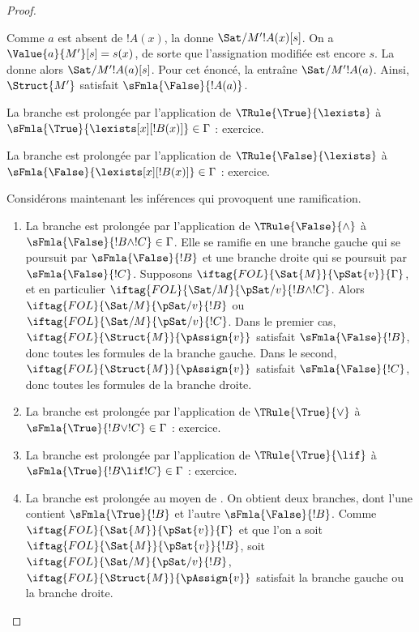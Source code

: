 \documentclass[../../../include/open-logic-section]{subfiles}
\begin{document}
\begin{proof}
\begin{enumerate}
{  Comme $a$ est absent de $!A(x)$, la
   donne $\Sat/{M'}{!A(x)}[s]$.
  On a $\Value{a}{M'}[s]=s(x)$, de sorte que l'assignation modifiée
  est encore $s$. La  donne alors
  $\Sat/{M'}{!A(a)}[s]$. Pour cet énoncé, la
   entraîne $\Sat/{M'}{!A(a)}$.
  Ainsi, $\Struct{M'}$ satisfait $\sFmla{\False}{!A(a)}$.
\item La branche est prolongée par l'application de
  $\TRule{\True}{\lexists}$ à
  $\sFmla{\True}{\lexists[x][!B(x)]} \in \Gamma$ : exercice.
\item La branche est prolongée par l'application de
  $\TRule{\False}{\lexists}$ à
  $\sFmla{\False}{\lexists[x][!B(x)]} \in \Gamma$ : exercice.}{}
\end{enumerate}
Considérons maintenant les inférences qui provoquent une ramification.
\begin{enumerate}
\item La branche est prolongée par l'application de
  $\TRule{\False}{\land}$ à
  $\sFmla{\False}{!B \land !C} \in \Gamma$. Elle se ramifie en une
  branche gauche qui se poursuit par $\sFmla{\False}{!B}$ et une
  branche droite qui se poursuit par $\sFmla{\False}{!C}$. Supposons
  $\iftag{FOL}{\Sat{M}}{\pSat{v}}{\Gamma}$, et en particulier
  $\iftag{FOL}{\Sat/{M}}{\pSat/{v}}{!B \land !C}$. Alors
  $\iftag{FOL}{\Sat/{M}}{\pSat/{v}}{!B}$ ou
  $\iftag{FOL}{\Sat/{M}}{\pSat/{v}}{!C}$. Dans le premier cas,
  $\iftag{FOL}{\Struct{M}}{\pAssign{v}}$ satisfait
  $\sFmla{\False}{!B}$, donc toutes les formules de la branche gauche.
  Dans le second,
  $\iftag{FOL}{\Struct{M}}{\pAssign{v}}$ satisfait
  $\sFmla{\False}{!C}$, donc toutes les formules de la branche droite.
\item La branche est prolongée par l'application de
  $\TRule{\True}{\lor}$ à
  $\sFmla{\True}{!B \lor !C} \in \Gamma$ : exercice.
\item La branche est prolongée par l'application de
  $\TRule{\True}{\lif}$ à
  $\sFmla{\True}{!B \lif !C} \in \Gamma$ : exercice.
\item La branche est prolongée au moyen de \Cut{}. On obtient deux
  branches, dont l'une contient $\sFmla{\True}{!B}$ et l'autre
  $\sFmla{\False}{!B}$. Comme
  $\iftag{FOL}{\Sat{M}}{\pSat{v}}{\Gamma}$ et que l'on a soit
  $\iftag{FOL}{\Sat{M}}{\pSat{v}}{!B}$, soit
  $\iftag{FOL}{\Sat/{M}}{\pSat/{v}}{!B}$,
  $\iftag{FOL}{\Struct{M}}{\pAssign{v}}$ satisfait la branche gauche
  ou la branche droite.
\end{enumerate}
\end{proof}
\end{document}
